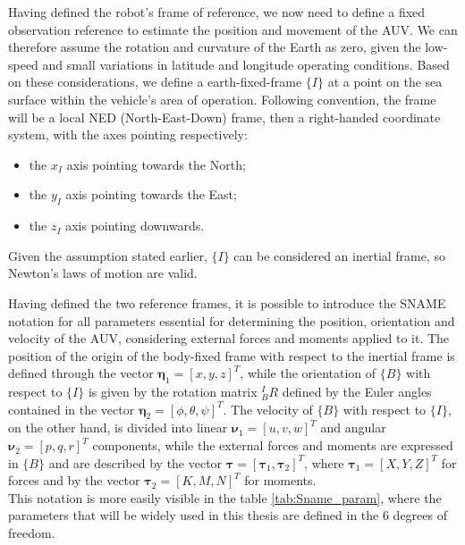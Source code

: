 Having defined the robot's frame of reference, we now need to define a fixed observation reference to estimate the position and movement of the AUV. 
We can therefore assume the rotation and curvature of the Earth as zero, given the low-speed and small variations in latitude and longitude operating conditions. 
Based on these considerations, we define a earth-fixed-frame $\{I\}$ at a point on the sea surface within the vehicle's area of operation. Following convention, 
the frame will be a local NED (North-East-Down) frame, then a right-handed coordinate system, with the axes pointing respectively:
\begin{itemize}
    \item the $x_I$ axis pointing towards the North;
    \item the $y_I$ axis pointing towards the East;
    \item the $z_I$ axis pointing downwards.
\end{itemize}
Given the assumption stated earlier, $\{I\}$ can be considered an inertial frame, so Newton's laws of motion are valid.

Having defined the two reference frames, it is possible to introduce the SNAME notation for all parameters essential for determining the position, orientation 
and velocity of the AUV, considering external forces and moments applied to it. The position of the origin of the body-fixed frame with respect to the inertial 
frame is defined through the vector $\mathbf{\eta}_1 = [x, y, z]^T$, while the orientation of $\{B\}$ with respect to $\{I\}$ is given by the rotation matrix 
$^{I}_{B}R$ defined by the Euler angles contained in the vector $\mathbf{\eta}_2 = [\phi, \theta, \psi]^T$.
The velocity of $\{B\}$ with respect to $\{I\}$, on the other hand, is divided into linear $\mathbf{\nu}_1 = [u, v, w]^T$ and angular $\mathbf{\nu}_2 = [p, q, r]^T$ 
components, while the external forces and moments are expressed in $\{B\}$ and are described by the vector $\mathbf{\tau} = [\mathbf{\tau}_1, \mathbf{\tau}_2]^T$, 
where $\mathbf{\tau}_1 = [X, Y, Z]^T$ for forces and by the vector $\mathbf{\tau}_2 = [K, M, N]^T$ for moments.\\

This notation is more easily visible in the table \ref{tab:Sname_param}, where the parameters that will be widely used in this thesis are defined in the 6 degrees of freedom.

